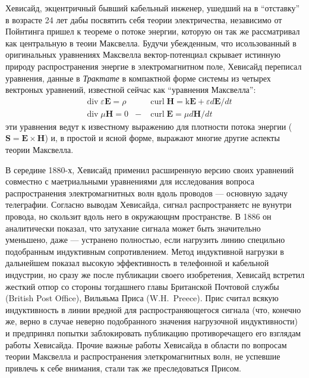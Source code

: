 \documentclass[12pt, oneside, a4paper]{article}
\begin{document}
Хевисайд, экцентричный бывший кабельный инженер, ушедший на в ``отставку'' в возрасте 24 лет дабы посвятить себя теории электричества, независимо от Пойнтинга пришел к теореме о потоке энергии, которую он так же рассматривал как центральную в теоии Максвелла. Будучи убежденным, что исользованный в оригинальных уравнениях Максвелла вектор-потенциал скрывает истинную природу распространения энергие в электромагнитном поле, Хевисайд переписал уравнения, данные в \emph{Трактате} в компактной форме системы из четырех вектроных уравнений, известной сейчас как ``уравнения Максвелла'':
\begin{align*}
&\operatorname{div}\varepsilon{}\mathbf{E} = \rho& 
&\operatorname{curl}\mathbf{H}=\mathrm{k}\mathbf{E} + \varepsilon{}d\mathbf{E}/dt\\
&\operatorname{div}\mu{}\mathbf{H}=0& 
-&\operatorname{curl}\mathbf{E}=\mu{}d\mathbf{H}/dt
\end{align*}
эти уравнения ведут к известному выражению для плотности потока энергии ($\mathbf{S}=\mathbf{E}\times\mathbf{H}$) и, в простой и ясной форме, выражают многие другие аспекты теории Максвелла.

В середине 1880-х, Хевисайд применил расширенную версию своих уравнений совместно с маетриальными уравнениями для исследования вопроса распространения электромагнитных волн вдоль проводов --- основную задачу телеграфии. Согласно выводам Хевисайда, сигнал распространяетс не вунутри провода, но скользит вдоль него в окружающнм пространстве. В 1886 он аналитически показал, что затухание сигнала может быть значительно уменьшено, даже --- устранено полностью, если нагрузить линию специльно подобранным индуктивным сопротивлением. Метод индуктивной нагрузки в дальнейшем показал высокую эффективность в телефонной и кабельной индустрии, но сразу же после публикации своего изобретения, Хевисайд встретил жесткий отпор со стороны тогдашнего главы Британской Почтовой службы (British Post Office), Вильяьма Приса (W.H.~Preece). Прис считал всякую индуктивность в линии вредной для распространяющегося сигнала (что, конечно же, верно в случае неверно подобранного значения нагрузочной индуктивности) и предпринял попытки заблокировать публикацию противоречащего его взглядам работы Хевисайда. Прочие важные работы Хевисайда в области по вопросам теории Максвелла и распространения элеткромагнитных волн, не успевшие привлечь к себе внимания, стали так же преследоваться Присом.
\end{document}
